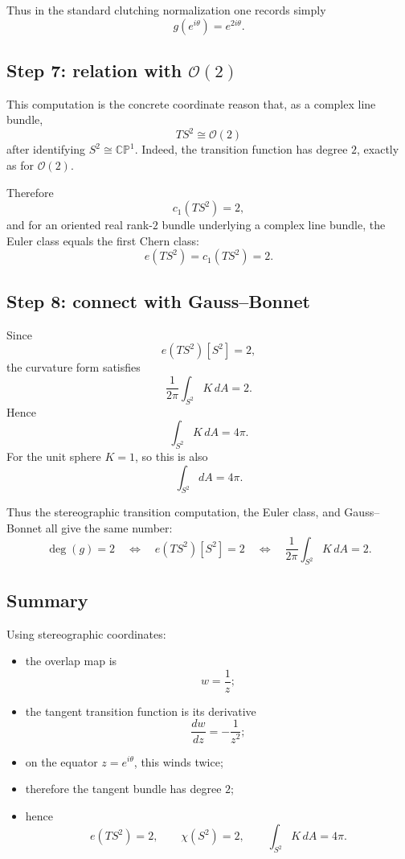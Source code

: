\documentclass[11pt]{article}
\begin{document}
	Thus in the standard clutching normalization one records simply
	\[
	g(e^{i\theta})=e^{2i\theta}.
	\]
	
	\subsection*{Step 7: relation with \(\mathcal O(2)\)}
	
	This computation is the concrete coordinate reason that, as a complex line bundle,
	\[
	TS^2 \cong \mathcal O(2)
	\]
	after identifying \(S^2\cong \mathbb{CP}^1\). Indeed, the transition function has degree \(2\), exactly as for \(\mathcal O(2)\).
	
	Therefore
	\[
	c_1(TS^2)=2,
	\]
	and for an oriented real rank-\(2\) bundle underlying a complex line bundle, the Euler class equals the first Chern class:
	\[
	e(TS^2)=c_1(TS^2)=2.
	\]
	
	\subsection*{Step 8: connect with Gauss--Bonnet}
	
	Since
	\[
	e(TS^2)[S^2]=2,
	\]
	the curvature form satisfies
	\[
	\frac{1}{2\pi}\int_{S^2}K\,dA=2.
	\]
	Hence
	\[
	\int_{S^2}K\,dA=4\pi.
	\]
	For the unit sphere \(K=1\), so this is also
	\[
	\int_{S^2}dA=4\pi.
	\]
	
	Thus the stereographic transition computation, the Euler class, and Gauss--Bonnet all give the same number:
	\[
	\boxed{
		\deg(g)=2
		\quad\Longleftrightarrow\quad
		e(TS^2)[S^2]=2
		\quad\Longleftrightarrow\quad
		\frac{1}{2\pi}\int_{S^2}K\,dA=2.
	}
	\]
	
	\subsection*{Summary}
	
	Using stereographic coordinates:
	\begin{itemize}
		\item the overlap map is
		\[
		w=\frac{1}{z};
		\]
		\item the tangent transition function is its derivative
		\[
		\frac{dw}{dz}=-\frac{1}{z^2};
		\]
		\item on the equator \(z=e^{i\theta}\), this winds twice;
		\item therefore the tangent bundle has degree \(2\);
		\item hence
		\[
		e(TS^2)=2,\qquad \chi(S^2)=2,\qquad \int_{S^2}K\,dA=4\pi.
		\]
	\end{itemize}
	
\end{document}

